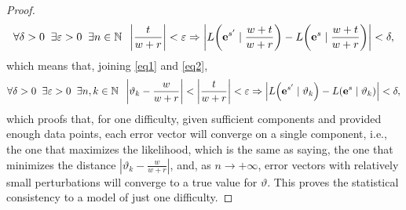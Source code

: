 \documentclass{article}
\newcommand{\0}{\mathbbold{0}}
\newcommand{\1}{\mathds{1}}
\newcommand{\Lh}[2]{L\!\left(#1 \mid #2\right)}
\begin{document}
\begin{proof}
    \begin{equation}
        \forall \delta > 0 \;\; \exists \varepsilon > 0 \;\; \exists n \in \mathbb{N} \;\; \left| \frac{t}{w+r} \right| < \varepsilon \Rightarrow \left| \Lh{{\bf e}^{s'}}{\frac{w+t}{w+r}} - \Lh{{\bf e}^{s}}{\frac{w+t}{w+r}} \right| < \delta, \label{eq2}
    \end{equation}
    which means that, joining \eqref{eq1} and \eqref{eq2},
    \begin{equation}
        \forall \delta > 0 \;\; \exists \varepsilon > 0 \;\; \exists n,k \in \mathbb{N} \;\; \left| \vartheta_k - \frac{w}{w+r} \right| < \left| \frac{t}{w+r} \right| < \varepsilon \Rightarrow \left| \Lh{{\bf e}^{s'}}{\vartheta_k} - \Lh{{\bf e}^{s}}{\vartheta_k} \right| < \delta, \label{eq3}
    \end{equation}
    which proofs that, for one difficulty, given sufficient components and provided enough data points, each error vector will converge on a single component, i.e., the one that maximizes the likelihood, which is the same as saying, the one that minimizes the distance $ \left| \vartheta_k - \frac{w}{w+r} \right| $, and, as $n \rightarrow +\infty$, error vectors with relatively small perturbations will converge to a true value for $\vartheta$.
    This proves the statistical consistency to a model of just one difficulty.
    

\end{proof}
\end{document}

